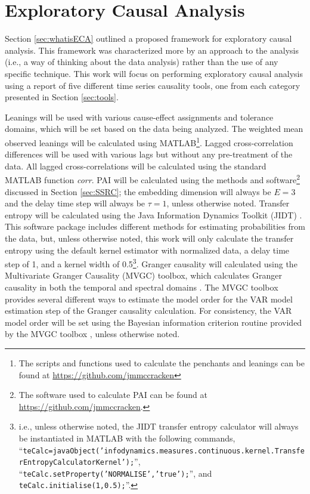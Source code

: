 \documentclass{article}[10pt]
\begin{document}
\section{Exploratory Causal Analysis}
\label{sec:ECA}
Section \ref{sec:whatisECA} outlined a proposed framework for exploratory causal analysis.  This framework was characterized more by an approach to the analysis (i.e., a way of thinking about the data analysis) rather than the use of any specific technique.  This work will focus on performing exploratory causal analysis using a report of five different time series causality tools, one from each category presented in Section \ref{sec:tools}. 

Leanings will be used with various cause-effect assignments and tolerance domains, which will be set based on the data being analyzed.  The weighted mean observed leanings will be calculated using {\sc MATLAB}\footnote{The scripts and functions used to calculate the penchants and leanings can be found at \url{https://github.com/jmmccracken}}.  Lagged cross-correlation differences will be used with various lags but without any pre-treatment of the data.  All lagged cross-correlations will be calculated using the standard {\sc MATLAB} function {\em corr}.  PAI will be calculated using the methods and software\footnote{The software used to calculate PAI can be found at \url{https://github.com/jmmccracken}.} discussed in Section \ref{sec:SSRC}; the embedding dimension will always be $E=3$ and the delay time step will always be $\tau=1$, unless otherwise noted.  Transfer entropy will be calculated using the Java Information Dynamics Toolkit (JIDT) \cite{Lizier2014}.  This software package includes different methods for estimating probabilities from the data, but, unless otherwise noted, this work will only calculate the transfer entropy using the default kernel estimator with normalized data, a delay time step of 1, and a kernel width of 0.5\footnote{i.e., unless otherwise noted, the JIDT transfer entropy calculator will always be instantiated in {\sc MATLAB} with the following commands, ``{\tt teCalc=javaObject('infodynamics.measures.continuous.kernel.TransferEntropyCalculatorKernel');}'', ``{\tt teCalc.setProperty('NORMALISE','true');}'', and {\tt teCalc.initialise(1,0.5);}''.}.  Granger causality will calculated using the Multivariate Granger Causality (MVGC) toolbox, which calculates Granger causality in both the temporal and spectral domains \cite{Barnett2015}.  The MVGC toolbox provides several different ways to estimate the model order for the VAR model estimation step of the Granger causality calculation.  For consistency, the VAR model order will be set using the Bayesian information criterion \cite{Box2013,Weakliem1999} routine provided by the MVGC toolbox \cite{Barnett2015}, unless otherwise noted.
\end{document}
